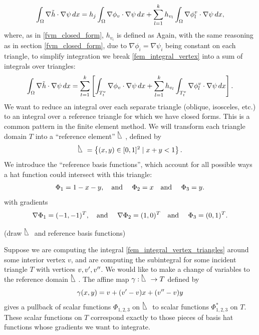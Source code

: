 \begin{equation}\label{fem_integral_vertex}
    \int_{{\Omega}} \nabla \tilde{h}\cdot \nabla \psi\,dx
     = h_j\int_{{\Omega}}\nabla\phi_v\cdot\nabla\psi\,dx + \sum_{l=1}^{k}h_{v_l}\int_{{\Omega}}\nabla\phi^v_l\cdot\nabla\psi\,dx,
\end{equation}
where, as in \ref{fvm_closed_form}, $h_{v_i}$ is defined as
\hvidefinition
Again, with the same reasoning as in section \ref{fvm_closed_form}, due to $\nabla\phi_i = \nabla\psi_i$ being constant on each triangle, to simplify integration
we break \eqref{fem_integral_vertex} into a sum of integrals over triangles:
\begin{equation}\label{fem_integral_vertex_triangles}
    \int_{{\Omega}} \nabla \tilde{h}\cdot \nabla \psi\,dx
    = \sum_{t=1}^k\left[\int_{T^v_t}\nabla\phi_v\cdot\nabla\psi\,dx + \sum_{l=1}^{k}h_{v_l}\int_{T^v_t}\nabla\phi^v_l\cdot\nabla\psi\,dx\right].
\end{equation}
We want to reduce an integral over each separate triangle (oblique, isosceles, etc.) to an integral over a reference triangle
for which we have closed forms.
This is a common pattern in the finite element method.
We will transform each triangle domain $T$ into a ``reference element''
\def\ll{{\mbox{\begin{picture}(7,10)
\put(1,0){\line(1,0){5}}
\put(6,0){\line(-1,2){5}}
\put(1,0){\line(0,1){10}}
\end{picture}
}}}
$\ll$, defined by
    $$\ll = \left\{(x,y) \in [0,1]^2 \mid x + y < 1\right\}.$$
We introduce the ``reference basis functions'', which account for all possible ways a hat function could intersect with this triangle:
\begin{equation}\label{fem_reference_basis_functions}
    \Phi_1 = 1-x-y, \text{\quad and \quad} \Phi_2 = x \text{\quad and \quad} \Phi_3 = y.
\end{equation}
with gradients
\begin{equation}\label{fem_reference_basis_function_gradients}
    \nabla\Phi_1 = (-1, -1)^T, \text{\quad and \quad} \nabla\Phi_2 = (1,0)^T \text{\quad and \quad} \Phi_3 = (0,1)^T.
\end{equation}

\vskip 0.2in
(draw $\ll$ and reference basis functions)
\vskip 0.2in

Suppose we are computing the integral \eqref{fem_integral_vertex_triangles} around some interior vertex $v$,
and are computing the subintegral for some incident triangle $T$ with vertices $v,v^{\prime},v^{\prime\prime}$.
We would like to make a change of variables to the reference domain $\ll$.
The affine map
\newcommand{\affmap}{\gamma}
$\affmap : \ll \rightarrow T$ defined by
\begin{equation}\label{fem_affine_map}
    \affmap(x,y) = v + (v^\pr - v)x + (v^\ppr - v)y
\end{equation}
gives a pullback of scalar functions $\Phi_{1,2,3}$ on $\ll$
to scalar functions $\Phi_{1,2,3}^*$ on $T$. These scalar functions on $T$ correspond
exactly to those pieces of basis hat functions whose gradients we want to integrate.

